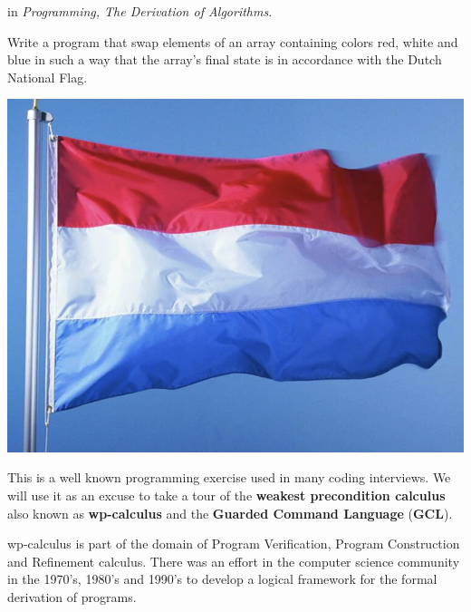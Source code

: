 
 in \textit{Programming, The Derivation of Algorithms}\cite{Kaldewaij90}.

\vspace{10 mm}
\begin{problem}
Write a program that swap elements of an array containing colors red, white and blue in such a way that the array's final state is in accordance with the Dutch National Flag. 
\end{problem}

\begin{marginfigure}
\includegraphics[scale=0.30]{flag.png}
\end{marginfigure}

This is a well known programming exercise used in many coding interviews. We will use it as an excuse to take a tour of the \textbf{weakest precondition calculus} also known as \textbf{wp-calculus} and the \textbf{Guarded Command Language} (\textbf{GCL}).

wp-calculus is part of the domain of Program Verification, Program Construction and Refinement calculus. There was an effort in the computer science community in the 1970's, 1980's and 1990's to develop a logical framework for the formal derivation of programs.


